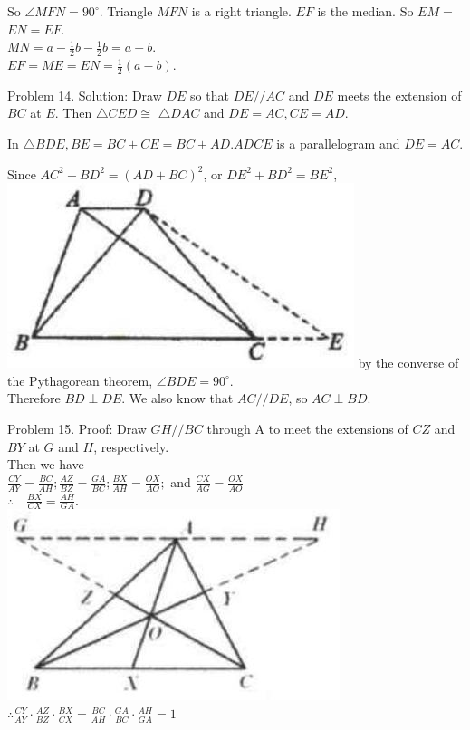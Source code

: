 \documentclass[10pt]{article}
\begin{document}
So \(\angle M F N=90^{\circ}\). Triangle \(M F N\) is a right triangle. \(E F\) is the median. So \(E M=\) \(E N=E F\).\\
\(M N=a-\frac{1}{2} b-\frac{1}{2} b=a-b\).\\
\(E F=M E=E N=\frac{1}{2}(a-b)\).

Problem 14. Solution:
Draw \(D E\) so that \(D E / / A C\) and \(D E\) meets the extension of \(B C\) at \(E\). Then \(\triangle C E D \cong\) \(\triangle D A C\) and \(D E=A C, C E=A D\).

In \(\triangle B D E, B E=B C+C E=B C+A D . A D C E\) is a parallelogram and \(D E=A C\).

Since \(A C^{2}+B D^{2}=(A D+B C)^{2}\), or \(D E^{2}+B D^{2}=B E^{2}\),\\
\includegraphics[max width=\textwidth]{2025_04_17_97bc1f7e44d93c271a88g-138(1)} by the converse of the Pythagorean theorem, \(\angle B D E=90^{\circ}\).\\
Therefore \(B D \perp D E\). We also know that \(A C / / D E\), so \(A C \perp B D\).

Problem 15. Proof:
Draw \(G H / / B C\) through A to meet the extensions of \(C Z\) and \(B Y\) at \(G\) and \(H\), respectively.\\
Then we have\\
\(\frac{C Y}{A Y}=\frac{B C}{A H} ; \frac{A Z}{B Z}=\frac{G A}{B C} ; \frac{B X}{A H}=\frac{O X}{A O} ;\) and \(\frac{C X}{A G}=\frac{O X}{A O}\)\\
\(\therefore \quad \frac{B X}{C X}=\frac{A H}{G A}\).\\
\includegraphics[max width=\textwidth, center]{2025_04_17_97bc1f7e44d93c271a88g-138}\\
\(\therefore \frac{C Y}{A Y} \cdot \frac{A Z}{B Z} \cdot \frac{B X}{C X}=\frac{B C}{A H} \cdot \frac{G A}{B C} \cdot \frac{A H}{G A}=1\)
\end{document}
